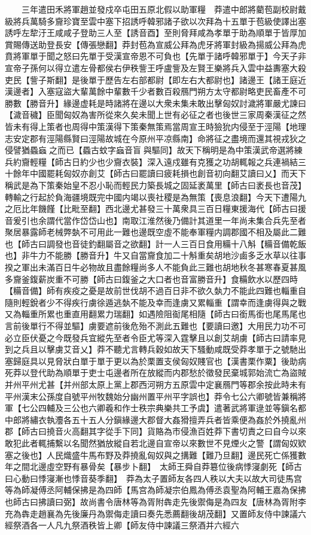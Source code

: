 　　三年遣田禾將軍趙並發戍卒屯田五原北假以助軍糧　莽遣中郎將藺苞副校尉戴級將兵萬騎多齎珍寶至雲中塞下招誘呼韓邪諸子欲以次拜為十五單于苞級使譯出塞誘呼左犂汙王咸咸子登助三人至【誘音酉】至則脅拜咸為孝單于助為順單于皆厚加賞賜傳送助登長安【傳張戀翻】莽封苞為宣威公拜為虎牙將軍封級為揚威公拜為虎賁將軍單于聞之怒曰先單于受漢宣帝恩不可負也【先單于諸呼韓邪單于】今天子非宣帝子孫何以得立遣左骨都侯右伊秩訾王呼盧訾及左賢王樂將兵入雲中益夀塞大殺吏民【訾子斯翻】是後單于歷告左右部都尉【即左右大都尉也】諸邊王【諸王庭近漢邊者】入塞寇盜大輩萬餘中輩數千少者數百殺鴈門朔方太守都尉略吏民畜產不可勝數【勝音升】緣邊虚耗是時諸將在邊以大衆未集未敢出擊匈奴討濊將軍嚴尤諫曰【濊音穢】臣聞匈奴為害所從來久矣未聞上世有必征之者也後世三家周秦漢征之然皆未有得上策者也周得中策漢得下策秦無策焉當周宣王時獫狁内侵至于涇陽【地理志安定郡有涇陽縣賢曰涇陽故城在今原州平凉縣南】命將征之盡境而還其視戎狄之侵譬猶蟁蝱之而已【蟁古蚊字蝱音盲與驅同】故天下稱明是為中策漢武帝選將練兵約齎輕糧【師古日約少也少齎衣裝】深入遠戍雖有克獲之功胡輒報之兵連禍結三十餘年中國罷耗匈奴亦創艾【師古曰罷讀曰疲耗損也創音初向翻艾讀曰乂】而天下稱武是為下策秦始皇不忍小恥而輕民力築長城之固延袤萬里【師古曰袤長也音茂】轉輸之行起於負海疆境既完中國内竭以喪社稷是為無策【喪息浪翻】今天下遭陽九之厄比年饑饉【比毗至翻】西北邊尤甚發三十萬衆具三百日糧東援海代【師古曰援音爰引也余謂代當作岱岱山也】南取江淮然後乃備計其道里一年尚未集合兵先至者聚居暴露師老械弊埶不可用此一難也邊既空虛不能奉軍糧内調郡國不相及屬此二難也【師古曰調發也音徒釣翻屬音之欲翻】計一人三百日食用糒十八斛【糒音備乾飯也】非牛力不能勝【勝音升】牛又自當齎食加二十斛重矣胡地沙鹵多乏水草以往事揆之軍出未滿百日牛必物故且盡餘糧尚多人不能負此三難也胡地秋冬甚寒春夏甚風多齎釜鍑薪炭重不可勝【師古曰鍑釜之大口者也音富勝音升】食糒飲水以歷四時【糒音備】師有疾疫之憂是故前世伐胡不過百日非不欲久埶力不能此四難也輜重自隨則輕銳者少不得疾行虜徐遁逃埶不能及幸而逢虜又累輜重【謂幸而逢虜得與之戰又為輜重所累也重直用翻累力瑞翻】如遇險阻䘖尾相隨【師古曰銜馬銜也尾馬尾也言前後單行不得並驅】虜要遮前後危殆不測此五難也【要讀曰邀】大用民力功不可必立臣伏憂之今既發兵宜縱先至者令臣尤等深入霆擊且以創艾胡虜【師古曰請率見到之兵且以擊虜艾音乂】莽不聽尤言轉兵穀如故天下騷動咸既受莽孝單于之號馳出塞歸庭具以見脅狀白單于單于更以為於栗置支侯匈奴賤官也【漢書栗作粟】後助病死莽以登代助為順單于吏士屯邊者所在放縱而内郡愁於徵發民棄城郭始流亡為盜賊并州平州尤甚【并州部太原上黨上郡西河朔方五原雲中定襄鴈門等郡余按此時未有平州漢末公孫度自號平州牧魏始分幽州置平州平字誤也】莽令七公六卿號皆兼稱將軍【七公四輔及三公也六卿羲和作士秩宗典樂共工予虞】遣著武將軍逯並等鎭名都中郎將繡衣執灋各五十五人分鎭緣邊大郡督大姦猾擅弄兵者皆乘便為姦於外撓亂州郡【師古曰撓音火高翻其字從手下同】貨賂為市侵漁百姓莽下書切責之曰自今以來敢犯此者輒捕繫以名聞然猶放縱自若北邊自宣帝以來數世不見煙火之警【謂匈奴欵塞之後也】人民熾盛牛馬布野及莽撓亂匈奴與之搆難【難乃旦翻】邊民死亡係獲數年之間北邊虛空野有暴骨矣【暴步卜翻】　太師王舜自莽簒位後病悸寖劇死【師古曰心動曰悸寖漸也悸音葵季翻】　莽為太子置師友各四人秩以大夫以故大司徒馬宫等為師凝傅丞阿輔保拂是為四師【馬宫為師凝宗伯鳳為傅丞袁聖為阿輔王嘉為保拂也師古曰拂讀曰弼】故尚書令唐林等為胥附犇走先後禦侮是為四友【唐林為胥附李充為犇走趙襄為先後廉丹為禦侮走讀曰奏先悉薦翻後胡茂翻】又置師友侍中諫議六經祭酒各一人凡九祭酒秩皆上卿【師友侍中諫議三祭酒并六經六